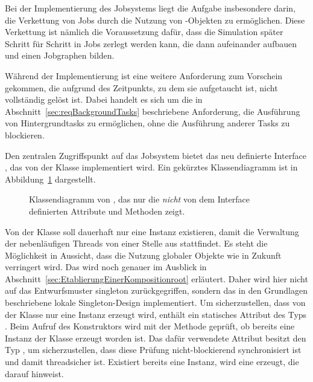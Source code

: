 Bei der Implementierung des Jobsystems liegt die Aufgabe insbesondere darin, die Verkettung von Jobs durch die Nutzung von -Objekten zu ermöglichen. Diese Verkettung ist nämlich die Voraussetzung dafür, dass die Simulation später Schritt für Schritt in Jobs zerlegt werden kann, die dann aufeinander aufbauen und einen Jobgraphen bilden. 

Während der Implementierung ist eine weitere Anforderung zum Vorschein gekommen, die aufgrund des Zeitpunkts, zu dem sie aufgetaucht ist, nicht vollständig gelöst ist. Dabei handelt es sich um die in Abschnitt~\vref{sec:reqBackgroundTasks} beschriebene Anforderung, die Ausführung von Hintergrundtasks zu ermöglichen, ohne die Ausführung anderer Tasks zu blockieren. 

Den zentralen Zugriffspunkt auf das Jobsystem bietet das neu definierte Interface , das von der Klasse  implementiert wird. Ein gekürztes Klassendiagramm ist in Abbildung~\ref{fig:diag-BlocklibExecutor} dargestellt.

\begin{figure}[!htb]
	\centering
	
	\caption[Gekürztes Klassendiagramm von .]{Klassendiagramm von , das nur die \emph{nicht} von dem Interface  definierten Attribute und Methoden zeigt.}\label{fig:diag-BlocklibExecutor}
\end{figure}

Von der Klasse  soll dauerhaft nur eine Instanz existieren, damit die Verwaltung der nebenläufigen Threads von einer Stelle aus stattfindet. Es steht die Möglichkeit in Aussicht, dass die Nutzung globaler Objekte wie  in Zukunft verringert wird. Das wird noch genauer im Ausblick in Abschnitt~\vref{sec:EtablierungEinerKompositionroot} erläutert. Daher wird hier nicht auf das Entwurfsmuster \gls{singleton} zurückgegriffen, sondern das in den Grundlagen beschriebene lokale Singleton-Design implementiert. Um sicherzustellen, dass von der Klasse nur eine Instanz erzeugt wird, enthält  ein statisches Attribut  des Typs . Beim Aufruf des Konstruktors wird mit der Methode  geprüft, ob bereits eine Instanz der Klasse erzeugt worden ist. Das dafür verwendete Attribut  besitzt den Typ , um sicherzustellen, dass diese Prüfung nicht-blockierend synchronisiert ist und damit threadsicher ist. Existiert bereits eine Instanz, wird eine  erzeugt, die darauf hinweist.

